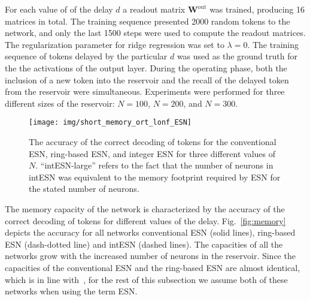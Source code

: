 For each value of of the delay $d$ a readout matrix $\textbf{W}^{\text{out}}$  was trained, producing 16 matrices in total. 
The training sequence presented 2000 random tokens to the network, and only the last 1500 steps were used to compute the readout matrices. The regularization parameter for ridge regression was set to $\lambda=0$.
The training sequence of tokens delayed by the particular $d$ was used as the ground truth for the the activations of the output layer.  
During the operating phase,  both the inclusion of a new token into the reservoir and the recall of the delayed token from the reservoir 
were simultaneous.  Experiments were performed for three different sizes of the reservoir: $N=100$, $N=200$, and $N=300$.


\begin{figure}[tb]%
\centering
\texttt{[image: img/short\_memory\_ort\_lonf\_ESN]}
\caption{The accuracy of the  correct decoding of tokens for the conventional ESN, ring-based ESN, and integer ESN for
three different values of $N$. ``intESN-large'' refers to the fact that the number of neurons in intESN was equivalent to the memory footprint required by ESN for the stated number of neurons.  
}
\label{fig:memory:long}
\end{figure}


The memory capacity of the network is characterized by the 
accuracy of the correct decoding of tokens for different values of the delay. 
Fig.~\ref{fig:memory} depicts the accuracy for all networks conventional ESN (solid lines), ring-based ESN (dash-dotted line)
and intESN (dashed lines). The capacities of all the networks grow with the
increased number of neurons in the reservoir.  
Since the capacities of the conventional ESN and the ring-based ESN are almost identical, which is in line with~\cite{Strauss2012}, for the rest of this subsection we assume both of these networks when using the term ESN.  


\begin{figure*}[tb]%
\label{fig:images}
\end{figure*}


